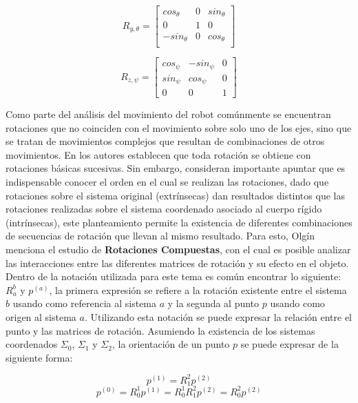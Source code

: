 \begin{equation*}
    R_{y,\theta}=\begin{bmatrix}
    cos_{\theta} & 0 & sin_{\theta}\\
    0 & 1 & 0\\
    -sin_{\theta} & 0 & cos_{\theta}\\
    \end{bmatrix}
\end{equation*}

\begin{equation*}
    R_{z,\psi}=\begin{bmatrix}
    cos_{\psi} & -sin_{\psi} & 0\\
    sin_{\psi} & cos_{\psi} & 0\\
    0 & 0 & 1
    \end{bmatrix}
\end{equation*}

Como parte del análisis del movimiento del robot comúnmente se encuentran rotaciones que no coinciden con el movimiento sobre solo uno de los ejes, sino que se tratan de movimientos complejos que resultan de combinaciones de otros movimientos. En \cite{olguin_diaz_3d_2019} los autores establecen que toda rotación se obtiene con rotaciones básicas sucesivas. Sin embargo, consideran importante apuntar que es indispensable conocer el orden en el cual se realizan las rotaciones, dado que rotaciones sobre el sistema original (extrínsecas) dan resultados distintos que las rotaciones realizadas sobre el sistema coordenado asociado al cuerpo rígido (intrínsecas), este planteamiento permite la existencia de diferentes combinaciones de secuencias de rotación que llevan al mismo resultado. Para esto, Olgín menciona el estudio de \textbf{Rotaciones Compuestas}, con el cual es posible analizar las interacciones entre las diferentes matrices de rotación y su efecto en el objeto. Dentro de la notación utilizada para este tema es común encontrar lo siguiente: \textbf{$R_{a}^{b}$} y \textbf{$p^{(a)}$}, la primera expresión se refiere a la rotación existente entre el sistema \textbf{$b$} usando como referencia al sistema \textbf{$a$} y la segunda al punto \textbf{$p$} usando como origen al sistema \textbf{$a$}. Utilizando esta notación se puede expresar la relación entre el punto y las matrices de rotación.
Asumiendo la existencia de los sistemas coordenados $\Sigma_{0}$, $\Sigma_{1}$ y $\Sigma_{2}$, la orientación de un punto $p$ se puede expresar de la siguiente forma: 

\begin{equation*}
    p^{(1)}=R_{1}^{2}p^{(2)}
\end{equation*}
\begin{equation*}
    p^{(0)}=R_{0}^{1}p^{(1)} =R_{0}^{1}R_{1}^{2}p^{(2)} =R_{0}^{2}p^{(2)}
\end{equation*}

